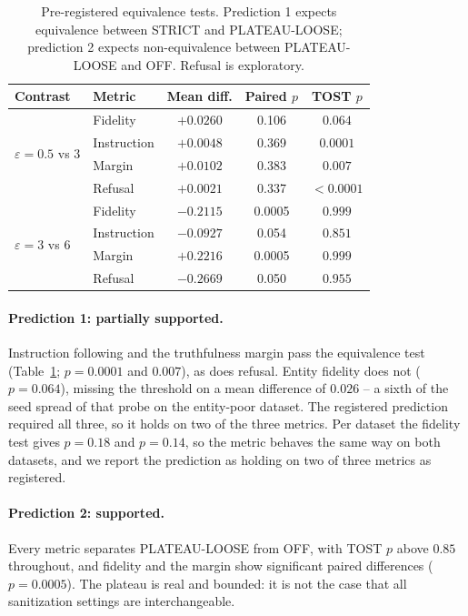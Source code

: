 \begin{table}[t]
  \centering
  \caption{Pre-registered equivalence tests.
  Prediction 1 expects equivalence between STRICT and PLATEAU-LOOSE;
  prediction 2 expects non-equivalence between PLATEAU-LOOSE and OFF.
  Refusal is exploratory.}
  \label{tab:tost}
  \begin{tabular}{llccc}
    \toprule
    Contrast & Metric & Mean diff. & Paired $p$ & TOST $p$ \\
    \midrule
    \multirow{4}{*}{$\varepsilon = 0.5$ vs $3$}
      & Fidelity    & $+0.0260$ & 0.106 & $0.064$ \\
      & Instruction & $+0.0048$ & 0.369 & $0.0001$ \\
      & Margin      & $+0.0102$ & 0.383 & $0.007$ \\
      & Refusal     & $+0.0021$ & 0.337 & $<0.0001$ \\
    \midrule
    \multirow{4}{*}{$\varepsilon = 3$ vs $6$}
      & Fidelity    & $-0.2115$ & 0.0005 & $0.999$ \\
      & Instruction & $-0.0927$ & 0.054 & $0.851$ \\
      & Margin      & $+0.2216$ & 0.0005 & $0.999$ \\
      & Refusal     & $-0.2669$ & 0.050 & $0.955$ \\
    \bottomrule
  \end{tabular}
\end{table}

\paragraph{Prediction 1: partially supported.}
Instruction following and the truthfulness margin pass the equivalence test (Table~\ref{tab:tost}; $p = 0.0001$ and $0.007$),
as does refusal.
Entity fidelity does not ($p = 0.064$),
missing the threshold on a mean difference of $0.026$ -- a sixth of the seed spread of that probe on the entity-poor dataset.
The registered prediction required all three,
so it holds on two of the three metrics.
Per dataset the fidelity test gives $p = 0.18$ and $p = 0.14$,
so the metric behaves the same way on both datasets,
and we report the prediction as holding on two of three metrics as registered.

\paragraph{Prediction 2: supported.}
Every metric separates PLATEAU-LOOSE from OFF,
with TOST $p$ above $0.85$ throughout,
and fidelity and the margin show significant paired differences ($p = 0.0005$).
The plateau is real and bounded:
it is not the case that all sanitization settings are interchangeable.

